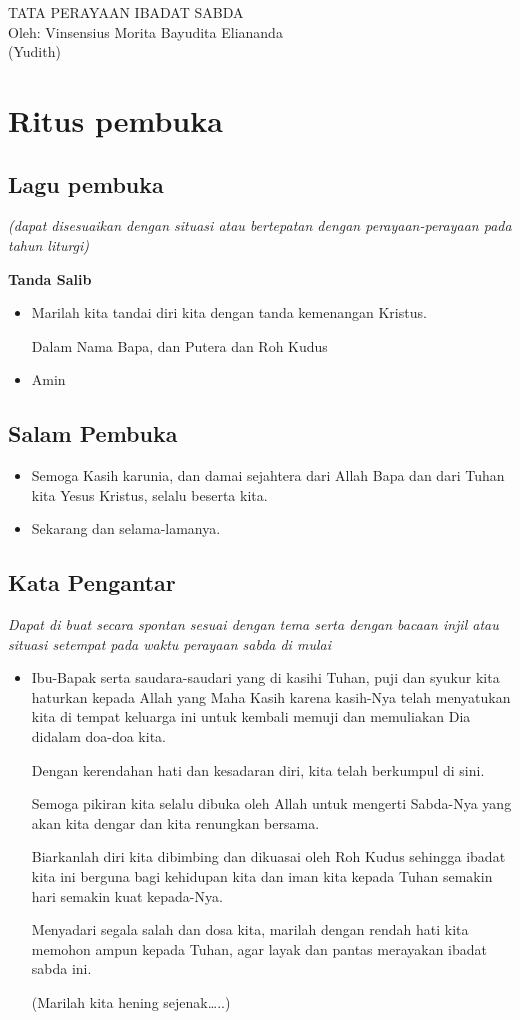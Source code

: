 \documentclass[a4paper,12pt]{article}
\title{}
\author{}
\date{2018-02-08}
\newcommand{\BU}[1]{\begin{itemize} \item[U:] #1 \end{itemize}}
\newcommand{\BP}[1]{\begin{itemize} \item[P:] #1 \end{itemize}}
\begin{document}
	\begin{center}
		\Large{TATA PERAYAAN IBADAT SABDA}\\
		\large{Oleh:}
		\large{Vinsensius Morita Bayudita Eliananda\\
		 (Yudith)}
	\end{center}

\section{Ritus pembuka}
 \subsection*{Lagu pembuka}

\textit{(dapat disesuaikan dengan situasi atau bertepatan dengan perayaan-perayaan pada tahun liturgi)
}

 \textbf{Tanda Salib}

\BP{Marilah kita tandai diri kita dengan tanda kemenangan Kristus. 

Dalam Nama Bapa, dan Putera dan Roh Kudus}

\BU{Amin}

\subsection*{Salam Pembuka}

\BP{Semoga Kasih karunia, dan damai sejahtera dari Allah Bapa dan dari Tuhan kita Yesus Kristus, selalu beserta kita.}

\BU{Sekarang dan selama-lamanya.}

 \subsection*{Kata Pengantar}

\textit{ Dapat di buat secara spontan sesuai dengan tema serta dengan bacaan injil atau situasi 
 setempat pada waktu perayaan sabda di mulai
}

\BP{Ibu-Bapak serta saudara-saudari yang di kasihi Tuhan, puji dan syukur kita haturkan kepada Allah yang Maha Kasih karena
kasih-Nya telah menyatukan kita di tempat keluarga ini untuk kembali memuji dan memuliakan Dia didalam doa-doa kita.

Dengan kerendahan hati dan kesadaran diri, kita telah berkumpul di sini.

Semoga pikiran kita selalu dibuka oleh Allah untuk mengerti Sabda-Nya yang akan kita dengar dan kita renungkan bersama.

Biarkanlah diri kita dibimbing dan dikuasai oleh Roh Kudus sehingga ibadat kita ini berguna bagi kehidupan kita dan iman
kita kepada Tuhan semakin hari semakin kuat kepada-Nya.

Menyadari segala salah dan dosa kita, marilah dengan rendah hati kita memohon ampun kepada Tuhan, agar layak dan pantas
merayakan ibadat sabda ini.

(Marilah kita hening sejenak{\dots}..)
}
\end{document}
